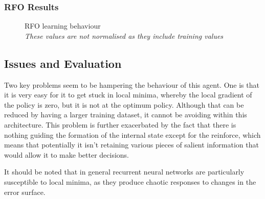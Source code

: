 \subsubsection{RFO Results}


\begin{figure}
\centering

\caption{RFO learning behaviour \\ \emph{These values are not normalised as they include training values}}
\label{fig:opt1full}
\end{figure}

\subsection{Issues and Evaluation}
Two key problems seem to be hampering the behaviour of this agent. One is that it is very easy for it to get stuck in local minima, whereby the local gradient of the policy is zero, but it is not at the optimum policy. Although that can be reduced by having a larger training dataset, it cannot be avoiding within this architecture. This problem is further exacerbated by the fact that there is nothing guiding the formation of the internal state except for the reinforce, which means that potentially it isn't retaining various pieces of salient information that would allow it to make better decisions.

It should be noted that in general recurrent neural networks are particularly susceptible to local minima, as they produce chaotic responses to changes in the error surface. \cite{rnns} %


